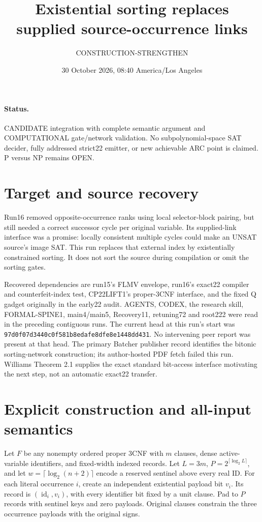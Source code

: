 \documentclass[11pt]{article}
\title{Existential sorting replaces supplied source-occurrence links}
\author{CONSTRUCTION-STRENGTHEN}\date{30 October 2026, 08:40 America/Los Angeles}
\begin{document}
\maketitle
\paragraph{Status.} CANDIDATE integration with complete semantic argument and
COMPUTATIONAL gate/network validation. No subpolynomial-space SAT decider,
fully addressed strict22 emitter, or new achievable ARC point is claimed.
P versus NP remains OPEN.

\section{Target and source recovery}
Run16 removed opposite-occurrence ranks using local selector-block pairing,
but still needed a correct successor cycle per original variable.
Its supplied-link interface was a promise: locally consistent multiple cycles
could make an UNSAT source's image SAT. This run replaces that external
index by existentially constrained sorting. It does not sort the source
during compilation or omit the sorting gates.

Recovered dependencies are run15's FLMV envelope, run16's exact22 compiler
and counterfeit-index test, CP22LIFT1's proper-3CNF interface, and the
fixed Q gadget originally in the early22 audit. AGENTS, CODEX, the research
skill, FORMAL-SPINE1, main4/main5, Recovery11, retuning72 and root222 were
read in the preceding contiguous runs. The current head at this run's
start was \texttt{97d0f07d3440c0f581b8edafe8dfe8e1448dd431}.
No intervening peer report was present at that head.
The primary Batcher publisher record identifies the bitonic sorting-network
construction; its author-hosted PDF fetch failed this run. Williams
Theorem 2.1 supplies the exact standard bit-access interface motivating
the next step, not an automatic exact22 transfer.

\section{Explicit construction and all-input semantics}
Let $F$ be any nonempty ordered proper 3CNF with $m$ clauses,
dense active-variable identifiers, and fixed-width indexed records.
Let $L=3m$, $P=2^{\lceil\log_2 L\rceil}$, and let
$w=\lceil\log_2(n+2)\rceil$ encode a reserved sentinel above every real ID.
For each literal occurrence $i$, create an independent existential payload
bit $v_i$. Its record is $(\operatorname{id}_i,v_i)$, with every identifier
bit fixed by a unit clause. Pad to $P$ records with sentinel keys and zero
payloads. Original clauses constrain the three occurrence payloads with
the original signs.
\end{document}

